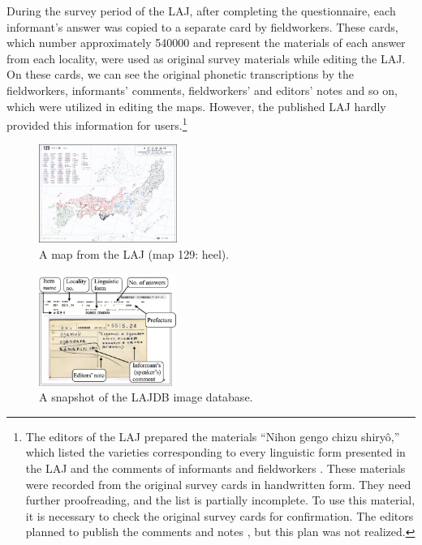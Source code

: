 \documentclass[output=paper]{LSP/langsci}
\begin{document}
During the survey period of the LAJ, after completing the questionnaire, each informant’s answer was copied to a separate card by fieldworkers. These cards, which number approximately 540000 \citep[38, 43]{kokuritsu_kokugo_kenkyujo_nlri_nihon_1966} and represent the materials of each answer from each locality, were used as original survey materials while editing the LAJ. On these cards, we can see the original phonetic transcriptions by the fieldworkers, informants’ comments, fieldworkers’ and editors’ notes and so on, which were utilized in editing the maps. However, the published LAJ hardly provided this information for users.\footnote{The editors of the LAJ prepared the materials “Nihon gengo chizu shiryô,” which listed the varieties corresponding to every linguistic form presented in the LAJ and the comments of informants and fieldworkers \citep[32, 33]{kokuritsu_kokugo_kenkyujo_nlri_nihon_1966}. These materials were recorded from the original survey cards in handwritten form. They need further proofreading, and the list is partially incomplete. To use this material, it is necessary to check the original survey cards for confirmation. The editors planned to publish the comments and notes \citep[44]{kokuritsu_kokugo_kenkyujo_nlri_nihon_1966}, but this plan was not realized.}

\begin{figure}
\includegraphics[width=0.4\textwidth]{illustrations/kuma_fig01}
\caption{A map from the LAJ (map 129: heel).}          
\label{fig:1}
\end{figure}  

\begin{figure}
\includegraphics[width=0.4\textwidth]{illustrations/kuma_fig02}
\caption{A snapshot of the LAJDB image database.}        
\label{fig:2}
\end{figure} 
\end{document}
